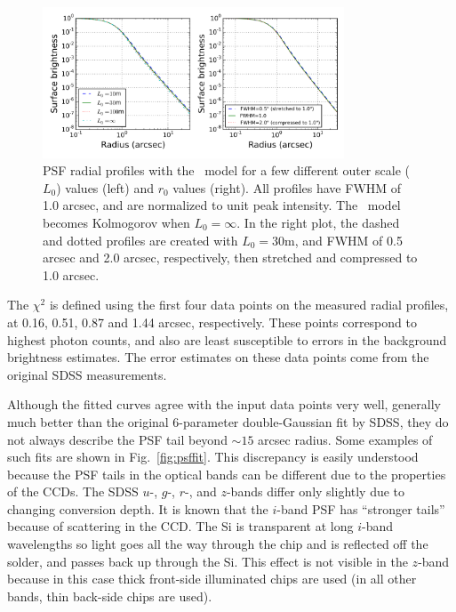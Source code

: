 \begin{figure}[ht]
\centering
\includegraphics[width=0.8\textwidth]{FIGURES/vonK.png}
\vskip -0.2in 
\caption{PSF radial profiles with the \vk~model for a few different
  outer scale ($L_0$) values (left) and $r_0$ values (right). 
All profiles have FWHM of 1.0 arcsec, and
  are normalized to unit peak intensity. The \vk~model becomes
  Kolmogorov when $L_0 = \infty$.
In the right plot, the dashed and dotted profiles are created with
$L_0 = 30$m, and 
FWHM of 0.5 arcsec and 2.0 arcsec, respectively, then stretched and compressed to 1.0 arcsec.
\label{fig:vonK}}
\end{figure}

The $\chi^2$ is defined using the first four data points on the
measured radial profiles, at 0.16, 0.51, 0.87 and 1.44 arcsec,
respectively. These points correspond to highest photon counts, and 
also are least susceptible to errors in the background brightness
estimates. 
The error estimates on these data points come from the original SDSS measurements.

Although the fitted
curves agree with the input data points very well, generally much better than the
original 6-parameter double-Gaussian fit by SDSS, they do not always describe
the PSF tail beyond $\sim 15$ arcsec radius. 
Some examples of such fits are shown in Fig.~\ref{fig:psffit}.
This discrepancy is easily understood
because the PSF tails in the optical bands can be 
different due to the properties of the CCDs.
The SDSS $u$-, $g$-, $r$-, and $z$-bands differ only slightly due to
changing conversion depth. It is known that the $i$-band PSF has ``stronger tails''
because of scattering in the CCD.  The Si is transparent at long $i$-band wavelengths 
so light goes all the way through the chip and is reflected off the solder, and passes 
back up through the Si. This effect is not visible in the $z$-band because in this case
thick front-side illuminated chips are used (in all other bands, thin back-side chips are used). 



